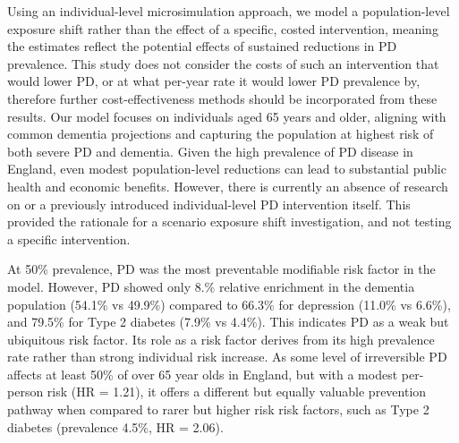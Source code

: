 \documentclass[11pt,a4paper]{article}
\begin{document}
Using an individual-level microsimulation approach, we model a population-level exposure shift rather than the effect of a specific, costed intervention, meaning the estimates reflect the potential effects of sustained reductions in PD prevalence. This study does not consider the costs of such an intervention that would lower PD, or at what per-year rate it would lower PD prevalence by, therefore further cost-effectiveness methods should be incorporated from these results. Our model focuses on individuals aged 65 years and older, aligning with common dementia projections and capturing the population at highest risk of both severe PD and dementia. Given the high prevalence of PD disease in England, even modest population-level reductions can lead to substantial public health and economic benefits. However, there is currently an absence of research on or a previously introduced individual-level PD intervention itself. This provided the rationale for a scenario exposure shift investigation, and not testing a specific intervention.

At 50\% prevalence, PD was the most preventable modifiable risk factor in the model. However, PD showed only 8.\% relative enrichment in the dementia population (54.1\% vs 49.9\%) compared to 66.3\% for depression (11.0\% vs 6.6\%), and 79.5\% for Type 2 diabetes (7.9\% vs 4.4\%). This indicates PD as a weak but ubiquitous risk factor. Its role as a risk factor derives from its high prevalence rate rather than strong individual risk increase. As some level of irreversible PD affects at least 50\% of over 65 year olds in England, but with a modest per-person risk (HR = 1.21), it offers a different but equally valuable prevention pathway when compared to rarer but higher risk risk factors, such as Type 2 diabetes (prevalence 4.5\%, HR = 2.06).
\end{document}
